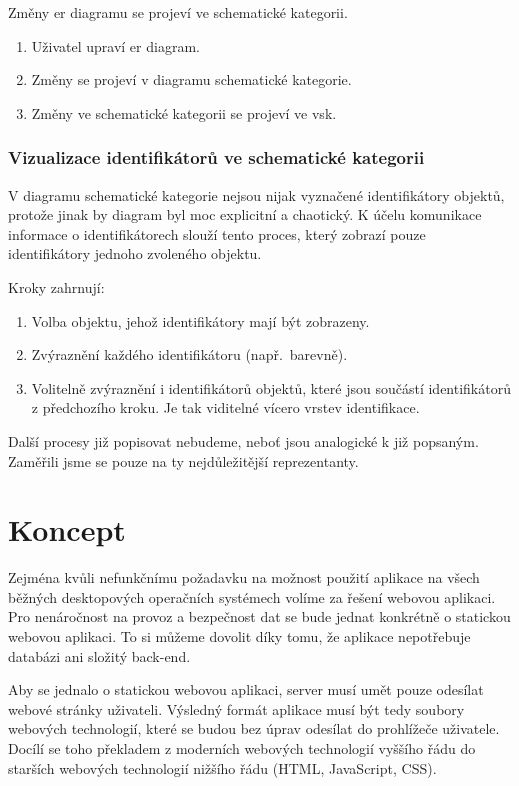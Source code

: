 Změny \acrshort{er} diagramu se projeví ve schematické kategorii.

\begin{enumerate}
  \item Uživatel upraví \acrshort{er} diagram.
  \item Změny se projeví v diagramu schematické kategorie.
  \item Změny ve schematické kategorii se projeví ve \acrshort{vsk}.
\end{enumerate}

\subsubsection*{Vizualizace identifikátorů ve schematické kategorii}
V diagramu schematické kategorie nejsou nijak vyznačené identifikátory objektů, protože jinak by diagram byl moc explicitní a chaotický.
K účelu komunikace informace o identifikátorech slouží tento proces, který zobrazí pouze identifikátory jednoho zvoleného objektu.

Kroky zahrnují:
\begin{enumerate}
  \item Volba objektu, jehož identifikátory mají být zobrazeny.
  \item Zvýraznění každého identifikátoru (např.~barevně).
  \item Volitelně zvýraznění i identifikátorů objektů, které jsou součástí identifikátorů z předchozího kroku.
        Je tak viditelné vícero vrstev identifikace.
\end{enumerate}

Další procesy již popisovat nebudeme, neboť jsou analogické k již popsaným.
Zaměřili jsme se pouze na ty nejdůležitější reprezentanty.

\section{Koncept}

Zejména kvůli nefunkčnímu požadavku na možnost použití aplikace na všech běžných desktopových operačních systémech volíme za řešení webovou aplikaci.
Pro nenáročnost na provoz a bezpečnost dat se bude jednat konkrétně o statickou webovou aplikaci.
To si můžeme dovolit díky tomu, že aplikace nepotřebuje databázi ani složitý back-end.

Aby se jednalo o statickou webovou aplikaci, server musí umět pouze odesílat webové stránky uživateli.
Výsledný formát aplikace musí být tedy soubory webových technologií, které se budou bez úprav odesílat do prohlížeče uživatele.
Docílí se toho překladem z moderních webových technologií vyššího řádu do starších webových technologií nižšího řádu (HTML, JavaScript, CSS).

